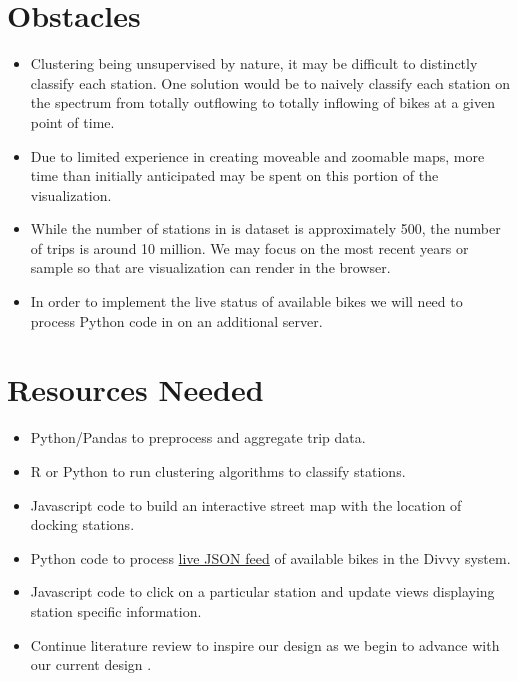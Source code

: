 \documentclass{proc}
\begin{document}
\section{Obstacles}

\begin{itemize}
\item Clustering being unsupervised by nature, it may be difficult to distinctly classify each station. One solution would be to naively classify each station on the spectrum from totally outflowing to totally inflowing of bikes at a given point of time. 
\item Due to limited experience in creating moveable and zoomable maps, more time than initially anticipated may be spent on this portion of the visualization.     
\item While the number of stations in is dataset is approximately 500, the number of trips is around 10 million. We may focus on the most recent years or sample so that are visualization can render in the browser.
\item In order to implement the live status of available bikes we will need to process Python code in on an additional server.     
\end{itemize}

\section{Resources Needed}

\begin{itemize}
\item Python/Pandas to preprocess and aggregate trip data.
\item R or Python to run clustering algorithms to classify stations.
\item Javascript code to build an interactive street map with the location of docking stations.
\item Python code to process \href{https://feeds.divvybikes.com/stations/stations.json}{\color{blue} live JSON feed} of available bikes in the Divvy system.  
\item Javascript code to click on a particular station and update views displaying station specific information. 
\item Continue literature review to inspire our design as we begin to advance with our current design \cite{oliveira2016visual}. 
\end{itemize}
\end{document}
